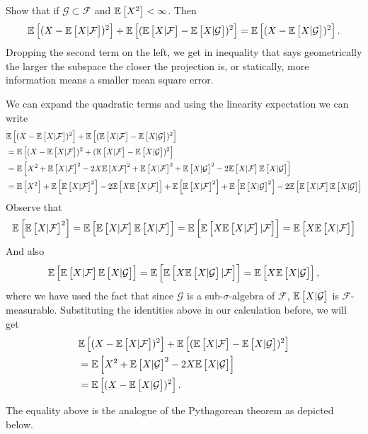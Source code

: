 \begin{problem}
	Show that if $ \mathcal{G} \subset \mathcal{F} $ and $ \E{X^2} < \infty $. Then 
	\[ \E{(X-\E{X|\mathcal{F}})^2} + \E{(\E{X|\mathcal{F}} - \E{X|\mathcal{G}})^2} = \E{(X-\E{X|\mathcal{G}})^2}. \]
	Dropping the second term on the left, we get in inequality that says geometrically the larger the subspace the closer the projection is, or statically, more information means a smaller mean square error.
\end{problem}
\begin{solution}
	We can expand the quadratic terms and using the linearity expectation we can write
	\begin{align*}
		 &\E{(X-\E{X|\mathcal{F}})^2} + \E{(\E{X|\mathcal{F}} - \E{X|\mathcal{G}})^2} \\
		 &= \E{(X-\E{X|\mathcal{F}})^2+(\E{X|\mathcal{F}} - \E{X|\mathcal{G}})^2} \\
		 &=\E{X^2 + \E{X|\mathcal{F}}^2 - 2X\E{X\mathcal{F}}^2 + \E{X|\mathcal{F}}^2 + \E{X|\mathcal{G}}^2 - 2\E{X|\mathcal{F}}\E{X|\mathcal{G}}} \\
		 &=\E{X^2} + \E{\E{X|\mathcal{F}}^2} - 2\E{X\E{X|\mathcal{F}}} + \E{\E{X|\mathcal{F}}^2} +\E{ \E{X|\mathcal{G}}^2} - 2\E{\E{X|\mathcal{F}}\E{X|\mathcal{G}}}	 
	\end{align*}
	Observe that
	\[ \E{\E{X|\mathcal{F}}^2} = \E{\E{X|\mathcal{F}}\E{X|\mathcal{F}}} = \E{\E{X\E{X|\mathcal{F}}|\mathcal{F}}} = \E{X\E{X|\mathcal{F}}} \]
	And also
	\[ \E{\E{X|\mathcal{F}}\E{X|\mathcal{G}}} = \E{\E{X\E{X|\mathcal{G}}|\mathcal{F}}} = \E{X\E{X|\mathcal{G}}}, \]
	where we have used the fact that since $ \mathcal{G} $ is a sub-$\sigma\text{-algebra}$ of $ \mathcal{F} $, $ \E{X|\mathcal{G}} $ is $ \mathcal{F} $-measurable. Substituting the identities above in our calculation before, we will get
	\begin{align*}
		 &\E{(X-\E{X|\mathcal{F}})^2} + \E{(\E{X|\mathcal{F}} - \E{X|\mathcal{G}})^2} \\
		 &=\E{X^2 + \E{X|\mathcal{G}}^2 - 2 X\E{X|\mathcal{G}}} \\
		 &= \E{(X - \E{X|\mathcal{G}})^2}.
	\end{align*}
\end{solution}
\begin{remark}
	The equality above is the analogue of the Pythagorean theorem as depicted below.
	
\end{remark}
\FloatBarrier

